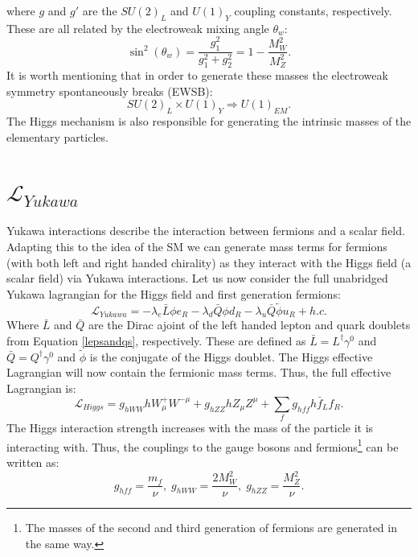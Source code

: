 where $g$ and $g'$ are the $SU(2)_L$ and $U(1)_Y$ coupling constants, respectively. These are all related by the electroweak mixing angle $\theta_w$:
\begin{equation}
    \sin^2(\theta_w)=\frac{g_1^2}{g_1^2+g_2^2}=1-\frac{M_W^2}{M_Z^2}.
\end{equation}
It is worth mentioning that in order to generate these masses the electroweak symmetry spontaneously breaks (EWSB):
\begin{equation*}
    SU(2)_L \times U(1)_Y \Rightarrow U(1)_{EM}.
\end{equation*}
The Higgs mechanism is also responsible for generating the intrinsic masses of the elementary particles.
\section{${\mathcal{L}_{Yukawa}}$}
Yukawa interactions \cite{Yukawa:1935xg} describe the interaction between  fermions and a scalar field. Adapting this to the idea of the SM we can generate mass terms for fermions (with both left and right handed chirality) as they interact with the Higgs field (a scalar field) via Yukawa interactions. Let us now consider the full unabridged Yukawa lagrangian for the Higgs field and first generation fermions:  
\begin{equation}
    \mathcal{L}_{Yukawa} =-\lambda_e \bar{L}\phi e_R -\lambda_d \bar{Q}\phi d_R -\lambda_u \bar{Q} \tilde{\phi} u_R + h.c.
\end{equation}
Where $\bar{L}$ and $\bar{Q}$ are the Dirac ajoint of the left handed lepton and quark doublets from Equation \ref{lepsandqs}, respectively. These are defined as  $\bar{L}=L^\dagger \gamma^0$ and $\bar{Q}=Q^\dagger \gamma^0$ and $\tilde{\phi}$ is the conjugate of the Higgs doublet. The Higgs effective Lagrangian will now contain the fermionic mass terms. Thus, the full effective Lagrangian is:
\begin{equation}\label{efflag}
    \mathcal{L}_{Higgs}= g_{hWW}hW^{+}_\mu W^{-\mu} + g_{hZZ}hZ_\mu Z^{\mu} + \sum_f g_{hff}h\bar{f}_L f_R.
\end{equation}
The Higgs interaction strength increases with the mass of the particle it is interacting with. Thus, the couplings to the gauge bosons and fermions\footnote{The masses of the second and third generation of fermions are generated in the same way.} can be written as:
\begin{equation}
    g_{hff}=\frac{m_f}{\nu},\; g_{hWW}=\frac{2M_W^2}{\nu}, \; g_{hZZ}=\frac{M_Z^2}{\nu}.
\end{equation}
